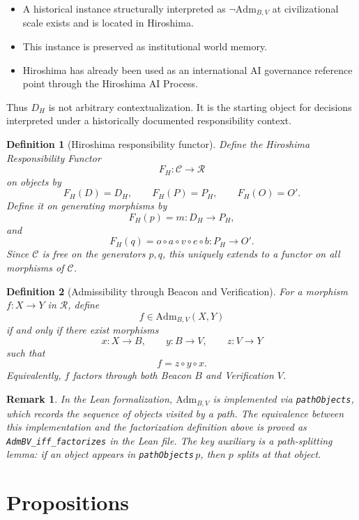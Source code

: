 \documentclass[11pt]{article}
\newtheorem{definition}{Definition}
\newtheorem{remark}{Remark}
\begin{document}
\begin{itemize}
  \item A historical instance structurally interpreted as
  $\neg\mathrm{Adm}_{B,V}$ at civilizational scale exists and is located in
  Hiroshima.
  \item This instance is preserved as institutional world memory.
  \item Hiroshima has already been used as an international AI governance
  reference point through the Hiroshima AI Process.
\end{itemize}

Thus $D_H$ is not arbitrary contextualization.  It is the starting object for
decisions interpreted under a historically documented responsibility context.

\begin{definition}[Hiroshima responsibility functor]
Define the Hiroshima Responsibility Functor
\[
  F_H:\mathcal{C}\to\mathcal{R}
\]
on objects by
\[
  F_H(D)=D_H,\qquad F_H(P)=P_H,\qquad F_H(O)=O'.
\]
Define it on generating morphisms by
\[
  F_H(p)=m:D_H\to P_H,
\]
and
\[
  F_H(q)=o\circ a\circ v\circ e\circ b:P_H\to O'.
\]
Since $\mathcal{C}$ is free on the generators $p,q$, this uniquely extends to
a functor on all morphisms of $\mathcal{C}$.
\end{definition}

\begin{definition}[Admissibility through Beacon and Verification]
For a morphism $f:X\to Y$ in $\mathcal{R}$, define
\[
  f\in \mathrm{Adm}_{B,V}(X,Y)
\]
if and only if there exist morphisms
\[
  x:X\to B,\qquad y:B\to V,\qquad z:V\to Y
\]
such that
\[
  f=z\circ y\circ x.
\]
Equivalently, $f$ factors through both Beacon $B$ and Verification $V$.
\end{definition}

\begin{remark}
In the Lean formalization, $\mathrm{Adm}_{B,V}$ is implemented via
\texttt{pathObjects}, which records the sequence of objects visited by a path.
The equivalence between this implementation and the factorization definition
above is proved as \texttt{AdmBV\_iff\_factorizes} in the Lean file.  The key
auxiliary is a path-splitting lemma: if an object appears in
\texttt{pathObjects}$\,p$, then $p$ splits at that object.
\end{remark}

\section*{Propositions}
\end{document}

